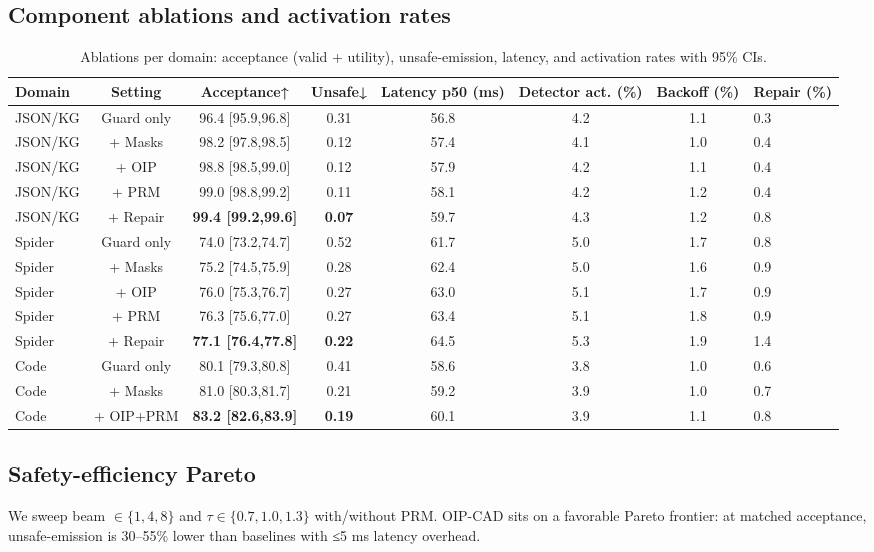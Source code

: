 \documentclass{article}
\begin{document}
\subsection{Component ablations and activation rates}
\begin{table}[H]
\centering
\small
\begin{tabular}{@{}lcccccc@{}}
\toprule
Domain & Setting & Acceptance↑ & Unsafe↓ & Latency p50 (ms) & Detector act. (\%) & Backoff (\%) & Repair (\%) \\
\midrule
JSON/KG & Guard only & 96.4 [95.9,96.8] & 0.31 & 56.8 & 4.2 & 1.1 & 0.3 \\
JSON/KG & + Masks & 98.2 [97.8,98.5] & 0.12 & 57.4 & 4.1 & 1.0 & 0.4 \\
JSON/KG & + OIP & 98.8 [98.5,99.0] & 0.12 & 57.9 & 4.2 & 1.1 & 0.4 \\
JSON/KG & + PRM & 99.0 [98.8,99.2] & 0.11 & 58.1 & 4.2 & 1.2 & 0.4 \\
JSON/KG & + Repair & \textbf{99.4 [99.2,99.6]} & \textbf{0.07} & 59.7 & 4.3 & 1.2 & 0.8 \\
\midrule
Spider & Guard only & 74.0 [73.2,74.7] & 0.52 & 61.7 & 5.0 & 1.7 & 0.8 \\
Spider & + Masks & 75.2 [74.5,75.9] & 0.28 & 62.4 & 5.0 & 1.6 & 0.9 \\
Spider & + OIP & 76.0 [75.3,76.7] & 0.27 & 63.0 & 5.1 & 1.7 & 0.9 \\
Spider & + PRM & 76.3 [75.6,77.0] & 0.27 & 63.4 & 5.1 & 1.8 & 0.9 \\
Spider & + Repair & \textbf{77.1 [76.4,77.8]} & \textbf{0.22} & 64.5 & 5.3 & 1.9 & 1.4 \\
\midrule
Code & Guard only & 80.1 [79.3,80.8] & 0.41 & 58.6 & 3.8 & 1.0 & 0.6 \\
Code & + Masks & 81.0 [80.3,81.7] & 0.21 & 59.2 & 3.9 & 1.0 & 0.7 \\
Code & + OIP+PRM & \textbf{83.2 [82.6,83.9]} & \textbf{0.19} & 60.1 & 3.9 & 1.1 & 0.8 \\
\bottomrule
\end{tabular}
\caption{Ablations per domain: acceptance (valid + utility), unsafe-emission, latency, and activation rates with 95\% CIs.}
\end{table}

\subsection{Safety-efficiency Pareto}
We sweep beam $\in\{1,4,8\}$ and $\tau\in\{0.7,1.0,1.3\}$ with/without PRM. OIP-CAD sits on a favorable Pareto frontier: at matched acceptance, unsafe-emission is 30–55\% lower than baselines with ≤5 ms latency overhead.
\end{document}
